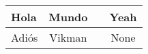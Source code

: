 \documentclass[10pt,a4paper]{article}
\begin{document}
\begin{tabular}{|>{\centering\arraybackslash}p{}|c|c|c|}
\hline 
Hola & Mundo & & Yeah \\ 
\hline 
Adiós & Vikman & & None \\
\hline 
\end{tabular}
\end{document}
